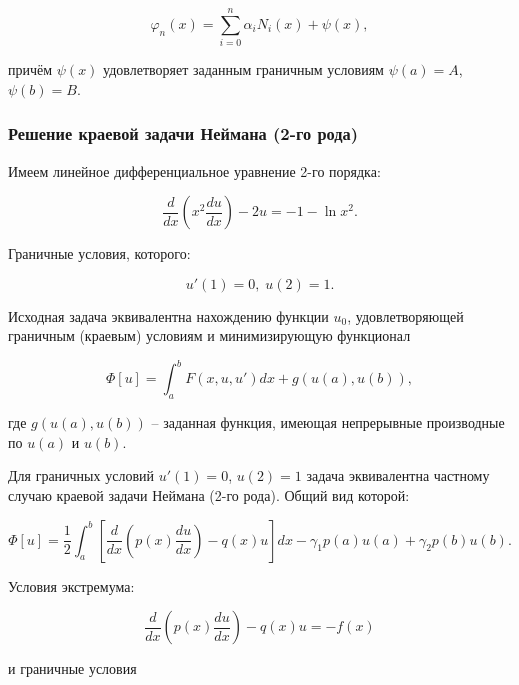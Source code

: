 \documentclass{article}
\begin{document}
\begin{equation}\label{equation_solve_var_rank_2}
	\varphi_{n}(x) = \sum_{i=0}^n \alpha_{i}N_{i}(x) + \psi(x),
\end{equation}

\noindent причём $\psi(x)$ удовлетворяет заданным граничным условиям $\psi(a) = A$, $\psi(b) = B$.

\subsubsection{Решение краевой задачи Неймана (2-го рода)}

Имеем линейное дифференциальное уравнение 2-го порядка:

\begin{displaymath}
	\frac{d}{dx} \left( x^2 \frac{d u}{dx} \right) - 2u = -1 - \ln{x^2}.
\end{displaymath}

\noindent Граничные условия, которого:

\begin{displaymath}
	u'(1) = 0, \; u(2) = 1.
\end{displaymath}

Исходная задача эквивалентна нахождению функции $u_{0}$, удовлетворяющей граничным (краевым) условиям и минимизирующую функционал

\begin{displaymath}
	\Phi[u] = \int_{a}^{b} F(x, u, u')dx + g(u(a), u(b)),
\end{displaymath}

\noindent где $g(u(a), u(b))$ – заданная функция, имеющая непрерывные производные по $u(a)$ и $u(b)$.

Для граничных условий $u'(1) = 0$, $u(2) = 1$ задача эквивалентна частному случаю краевой задачи Неймана (2-го рода). Общий вид которой:

\begin{displaymath}
	\Phi[u] = \frac{1}{2} \int_{a}^{b} \left[ \frac{d}{dx} \left( p(x) \frac{d u}{dx} \right) - q(x)u \right] dx - \gamma_{1} p(a) u(a) + \gamma_{2} p(b) u(b).
\end{displaymath}

\noindent Условия экстремума:

\begin{displaymath}
	\frac{d}{dx} \left( p(x) \frac{d u}{dx} \right) - q(x)u = -f(x)
\end{displaymath}

\noindent и граничные условия
\end{document}
